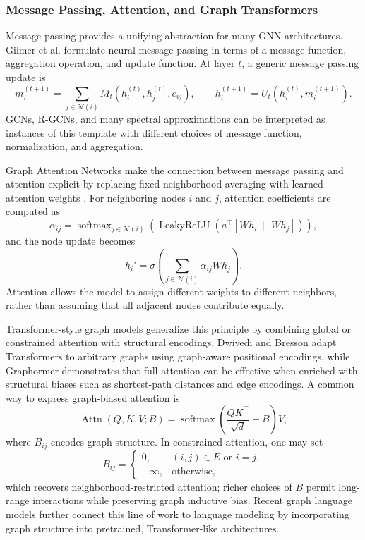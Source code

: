 \documentclass[11pt]{article}
\theoremstyle{definition}
\begin{document}
\subsubsection{Message Passing, Attention, and Graph Transformers}
Message passing provides a unifying abstraction for many GNN architectures. Gilmer et al. \cite{gilmer2017neural} formulate neural message passing in terms of a message function, aggregation operation, and update function. At layer $t$, a generic message passing update is
\[
    m_i^{(t+1)}
    = \sum_{j\in\mathcal{N}(i)} M_t\!\left(h_i^{(t)}, h_j^{(t)}, e_{ij}\right),
    \qquad
    h_i^{(t+1)}
    = U_t\!\left(h_i^{(t)}, m_i^{(t+1)}\right).
\]
GCNs, R-GCNs, and many spectral approximations can be interpreted as instances of this template with different choices of message function, normalization, and aggregation.

Graph Attention Networks make the connection between message passing and attention explicit by replacing fixed neighborhood averaging with learned attention weights \cite{velickovic2018graph}. For neighboring nodes $i$ and $j$, attention coefficients are computed as
\[
    \alpha_{ij}
    = \operatorname{softmax}_{j\in\mathcal{N}(i)}
      \left(
      \operatorname{LeakyReLU}\!\left(a^\top[Wh_i\,\|\,Wh_j]\right)
      \right),
\]
and the node update becomes
\[
    h_i'
    = \sigma\!\left(\sum_{j\in\mathcal{N}(i)} \alpha_{ij}Wh_j\right).
\]
Attention allows the model to assign different weights to different neighbors, rather than assuming that all adjacent nodes contribute equally.

Transformer-style graph models generalize this principle by combining global or constrained attention with structural encodings. Dwivedi and Bresson \cite{dwivedi2020generalization} adapt Transformers to arbitrary graphs using graph-aware positional encodings, while Graphormer \cite{ying2021transformers} demonstrates that full attention can be effective when enriched with structural biases such as shortest-path distances and edge encodings. A common way to express graph-biased attention is
\[
    \operatorname{Attn}(Q,K,V;B)
    = \operatorname{softmax}\!\left(\frac{QK^\top}{\sqrt{d}} + B\right)V,
\]
where $B_{ij}$ encodes graph structure. In constrained attention, one may set
\[
    B_{ij}=
    \begin{cases}
    0, & (i,j)\in E \text{ or } i=j,\\
    -\infty, & \text{otherwise},
    \end{cases}
\]
which recovers neighborhood-restricted attention; richer choices of $B$ permit long-range interactions while preserving graph inductive bias. Recent graph language models \cite{plenz-frank-2024-graph} further connect this line of work to language modeling by incorporating graph structure into pretrained, Transformer-like architectures.
\end{document}

